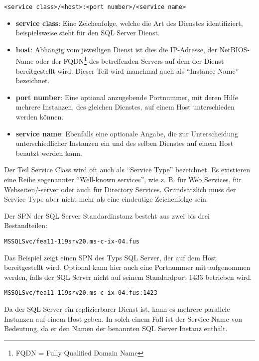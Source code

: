           \texttt{<service class>/<host>:<port number>/<service name>}
        
          \begin{itemize}
            \item \textbf{service class}: Eine Zeichenfolge, welche die Art des
            Dienstes identifiziert, beispielsweise steht  für
            den SQL Server Dienst.
            \item \textbf{host}: Abhängig vom jeweiligen Dienst ist dies die
            IP-Adresse, der NetBIOS-Name oder der FQDN\footnote{FQDN = Fully
            Qualified Domain Name} des betreffenden Servers auf dem der Dienst
            bereitgestellt wird. Dieser Teil wird manchmal auch als
            \enquote{Instance Name} bezeichnet.
            \item \textbf{port number}: Eine optional anzugebende Portnummer, mit
            deren Hilfe mehrere Instanzen, des gleichen Dienstes, auf einem Host
            unterschieden werden können.
            \item \textbf{service name}: Ebenfalls eine optionale Angabe, die zur
            Unterscheidung unterschiedlicher Instanzen ein und des selben Dienstes
            auf einem Host benutzt werden kann.
          \end{itemize}
          Der Teil Service Class wird oft auch als \enquote{Service Type}
          bezeichnet. Es existieren eine Reihe sogenannter \enquote{Well-known
          services}, wie z. B.  für Web Services,  für
          Webseiten/-server oder auch  für Directory Services.
          Grundsätzlich muss der Service Type aber nicht mehr als eine eindeutige
          Zeichenfolge sein.

          Der SPN der SQL Server Standardinstanz besteht aus zwei bis drei
          Bestandteilen:
          
          \texttt{MSSQLSvc/fea11-119srv20.ms-c-ix-04.fus}
          
          Das Beispiel zeigt einen SPN des Typs SQL Server, der auf dem Host
           bereitgestellt wird. Optional
          kann hier auch eine Portnummer mit aufgenommen werden, falls der SQL
          Server nicht auf seinem Standardport 1433 betrieben wird.
          
          \texttt{MSSQLSvc/fea11-119srv20.ms-c-ix-04.fus:1423}

          Da der SQL Server ein replizierbarer Dienst ist, kann es mehrere
          parallele Instanzen auf einem Host geben. In solch einem Fall ist
          der Service Name von Bedeutung, da er den Namen der benannten SQL
          Server Instanz enthält.
          
